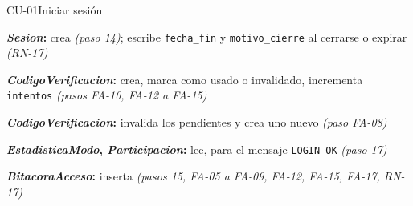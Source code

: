\begin{fichacu}{CU-01}{Iniciar sesión}
{\begin{cudatos}
      \item \textbf{\textit{Sesion}:} crea \textit{(paso 14)}; escribe \texttt{fecha\_\allowbreak{}fin} y \texttt{motivo\_\allowbreak{}cierre} al cerrarse o expirar \textit{(\mbox{RN-17})}
      \item \textbf{\textit{CodigoVerificacion}:} crea, marca como usado o invalidado, incrementa \texttt{intentos} \textit{(pasos \mbox{FA-10}, \mbox{FA-12} a \mbox{FA-15})}
      \item \textbf{\textit{CodigoVerificacion}:} invalida los pendientes y crea uno nuevo \textit{(paso \mbox{FA-08})}
      \item \textbf{\textit{EstadisticaModo}, \textit{Participacion}:} lee, para el mensaje \texttt{LOGIN\_\allowbreak{}OK} \textit{(paso 17)}
      \item \textbf{\textit{BitacoraAcceso}:} inserta \textit{(pasos 15, \mbox{FA-05} a \mbox{FA-09}, \mbox{FA-12}, \mbox{FA-15}, \mbox{FA-17}, \mbox{RN-17})}
    \end{cudatos}} \\ \hline
\end{fichacu}
\clearpage
